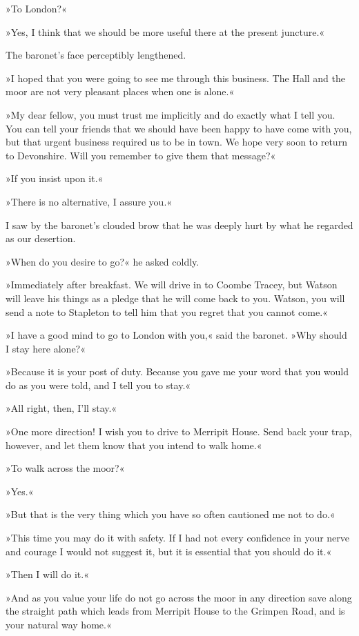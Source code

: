 »To London?«

»Yes, I think that we should be more useful there at the present juncture.«

The baronet's face perceptibly lengthened.

»I hoped that you were going to see me through this business. The Hall and the moor are not very pleasant places when one is alone.«

»My dear fellow, you must trust me implicitly and do exactly what I tell you. You can tell your friends that we should have been happy to have come with you, but that urgent business required us to be in town. We hope very soon to return to Devonshire. Will you remember to give them that message?«

»If you insist upon it.«

»There is no alternative, I assure you.«

I saw by the baronet's clouded brow that he was deeply hurt by what he regarded as our desertion.

»When do you desire to go?« he asked coldly.

»Immediately after breakfast. We will drive in to Coombe Tracey, but Watson will leave his things as a pledge that he will come back to you. Watson, you will send a note to Stapleton to tell him that you regret that you cannot come.«

»I have a good mind to go to London with you,« said the baronet. »Why should I stay here alone?«

»Because it is your post of duty. Because you gave me your word that you would do as you were told, and I tell you to stay.«

»All right, then, I'll stay.«

»One more direction! I wish you to drive to Merripit House. Send back your trap, however, and let them know that you intend to walk home.«

»To walk across the moor?«

»Yes.«

»But that is the very thing which you have so often cautioned me not to do.«

»This time you may do it with safety. If I had not every confidence in your nerve and courage I would not suggest it, but it is essential that you should do it.«

»Then I will do it.«

»And as you value your life do not go across the moor in any direction save along the straight path which leads from Merripit House to the Grimpen Road, and is your natural way home.«

